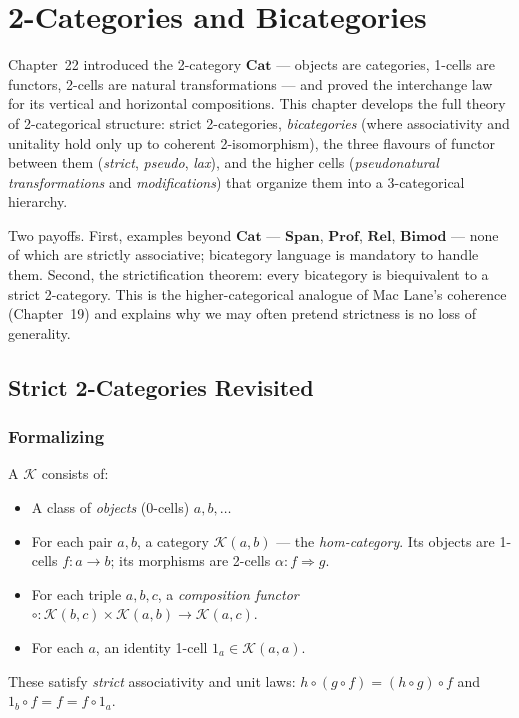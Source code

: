 
\chapter{2-Categories and Bicategories}

\begin{overviewbox}
Chapter~22 introduced the 2-category $\mathbf{Cat}$ — objects are categories,
1-cells are functors, 2-cells are natural transformations — and proved the
interchange law for its vertical and horizontal compositions. This chapter
develops the full theory of 2-categorical structure: strict 2-categories,
\emph{bicategories} (where associativity and unitality hold only up to
coherent 2-isomorphism), the three flavours of functor between them
(\emph{strict}, \emph{pseudo}, \emph{lax}), and the higher cells
(\emph{pseudonatural transformations} and \emph{modifications}) that organize
them into a 3-categorical hierarchy.

Two payoffs. First, examples beyond $\mathbf{Cat}$ — $\mathbf{Span}$,
$\mathbf{Prof}$, $\mathbf{Rel}$, $\mathbf{Bimod}$ — none of which are
strictly associative; bicategory language is mandatory to handle them.
Second, the strictification theorem: every bicategory is biequivalent to a
strict 2-category. This is the higher-categorical analogue of Mac Lane's
coherence (Chapter~19) and explains why we may often pretend strictness is
no loss of generality.
\end{overviewbox}


\section{Strict 2-Categories Revisited}
\label{sec:strict-2cat-revisited}

\subsection{Formalizing}

\begin{definition}
A  $\mathcal{K}$ consists of:
\begin{itemize}
  \item A class of \emph{objects} (0-cells) $a, b, \ldots$
  \item For each pair $a, b$, a category $\mathcal{K}(a, b)$ — the
        \emph{hom-category}. Its objects are 1-cells $f : a \to b$; its
        morphisms are 2-cells $\alpha : f \Rightarrow g$.
  \item For each triple $a, b, c$, a \emph{composition functor}
        $\circ : \mathcal{K}(b,c) \times \mathcal{K}(a,b) \to \mathcal{K}(a,c)$.
  \item For each $a$, an identity 1-cell $1_a \in \mathcal{K}(a,a)$.
\end{itemize}
These satisfy \emph{strict} associativity and unit laws:
$h \circ (g \circ f) = (h \circ g) \circ f$ and $1_b \circ f = f = f \circ 1_a$.
\end{definition}

